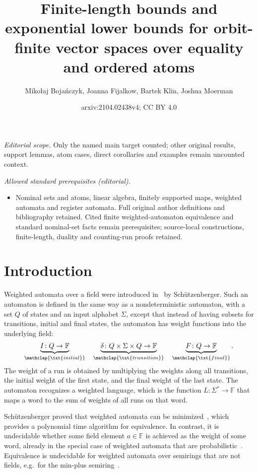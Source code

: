 \documentclass[10pt,a4paper]{amsart}
\title{Finite-length bounds and exponential lower bounds for orbit-finite vector spaces over equality and ordered atoms}
\author{Mikołaj Bojańczyk, Joanna Fijalkow, Bartek Klin, Joshua Moerman}
\date{arxiv:2104.02438v4; CC BY 4.0}
\numberwithin{equation}{section}
\newcommand{\myunderbrace}[2]{\underbrace{#1}_{\mathclap{\txt{\scriptsize #2}}}}
\newcommand{\field}{\mathbb F}
\newcommand{\schutz}{Sch\"utzenberger\xspace}
\begin{document}
\maketitle
\noindent\textit{Editorial scope.} Only the named main target counted; other original results, support lemmas, atom cases, direct corollaries and examples remain uncounted context.\par\medskip
\noindent\textit{Allowed standard prerequisites (editorial).}\begin{itemize}
\item Nominal sets and atoms, linear algebra, finitely supported maps, weighted automata and register automata. Full original author definitions and bibliography retained. Cited finite weighted-automaton equivalence and standard nominal-set facts remain prerequisites; source-local constructions, finite-length, duality and counting-run proofs retained.
\end{itemize}\medskip
\section{Introduction}
Weighted automata over a field were introduced in~\cite{schutzenberger1961definition} by \schutz. Such an automaton is defined in the same way as a nondeterministic automaton, with a set $Q$ of states and an input alphabet $\Sigma$, except that instead of having subsets for transitions, initial and final states, the automaton has weight functions into the underlying field:
\begin{align*}
    \myunderbrace{I \colon Q \to \field}{initial} 
    \quad 
    \myunderbrace{\delta \colon Q \times \Sigma \times Q \to \field}{transition}
    \quad 
    \myunderbrace{F \colon Q \to \field}{final}.
\end{align*}
The weight of a run is obtained by multiplying the weights along all transitions, the initial weight of the first state, and the final weight of the last state. The  automaton recognizes a weighted language, which  is the function $L \colon \Sigma^* \to \field$ that maps a word to the sum of weights of all runs on that word.   

\schutz proved that weighted automata can be minimized~\cite[Sec.~B]{schutzenberger1961definition},
which provides a polynomial time algorithm for equivalence.
In contrast, it is undecidable whether some field element $a \in \field$ is achieved as the weight of some  word,  already in the special case of weighted automata that are probabilistic~\cite[Thm.~22]{nasu1969mappings}. Equivalence  is undecidable for weighted automata over semirings that are not fields, e.g.~for the min-plus semiring~\cite[Cor.~4.3]{krob1992}.
\end{document}
